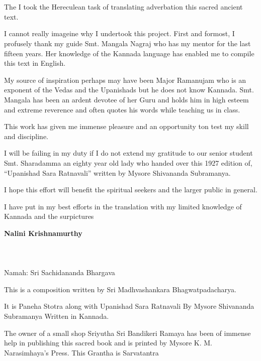
\chapter*{}

The I took the Hereculean task of translating adverbation this sacred ancient text.

I cannot really imageine why I undertook this project. First and formost, I profusely thank my guide Smt. Mangala Nagraj who has my mentor for the last fifteen years. Her knowledge of the Kannada language has enabled me to compile this text in English.

My source of inspiration perhaps may have been Major Ramanujam who is an exponent of the Vedas and the Upanishads but he does not know Kannada. Smt. Mangala has been an ardent devotee of her Guru and holds him in high esteem and extreme reverence and often quotes his words while teaching us in class.

This work has given me immense pleasure and an opportunity ton test my skill and discipline.

I will be failing in my duty if I do not extend my gratitude to our senior student Smt. Sharadamma an eighty year old lady who handed over this 1927 edition of, “Upanishad Sara Ratnavali” written by Mysore Shivananda Subramanya.

I hope this effort will benefit the spiritual seekers and the larger public in general.

I have put in my best efforts in the translation with my limited knowledge of Kannada and the surpictures

\begin{flushright}
\textbf{Nalini Krishnamurthy}
\end{flushright}

\chapter*{}

\begin{center}
\\ Namah: Sri Sachidananda Bhargava
\end{center}

This is a composition written by Sri Madhvashankara Bhagwatpada\-charya.

It is Paneha Stotra along with Upanishad Sara Ratnavali By Mysore Shivananda Subramanya Written in Kannada.

The owner of a small shop Sriyutha  Sri Bandikeri Ramaya has been of immense help in publishing this sacred book and is printed by Mysore K. M. Narasimhaya's Press. This Grantha is Sarvatantra

